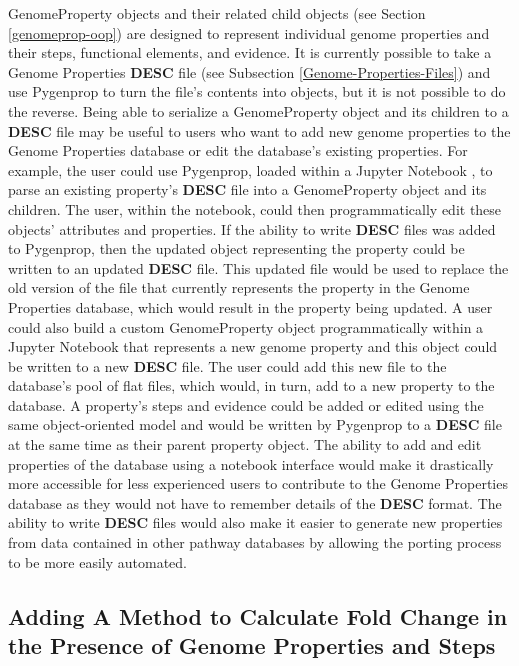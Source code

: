 GenomeProperty objects and their related child objects (see Section 
\ref{genomeprop-oop}) are designed to represent individual genome properties and 
their steps, functional elements, and evidence. It is currently possible to take 
a Genome Properties \textbf{DESC} file (see Subsection 
\ref{Genome-Properties-Files}) and use Pygenprop to turn the file's contents 
into objects, but it is not possible to do the reverse. Being able to serialize 
a GenomeProperty object and its children to a \textbf{DESC} file may be useful 
to users who want to add new genome properties to the Genome Properties database 
or edit the database's existing properties. For example, the user could use 
Pygenprop, loaded within a Jupyter Notebook \cite{kluyver2016jupyter}, to parse 
an existing property's \textbf{DESC} file into a GenomeProperty object and its 
children. The user, within the notebook, could then programmatically edit these 
objects' attributes and properties. If the ability to write \textbf{DESC} files 
was added to Pygenprop, then the updated object representing the property could 
be written to an updated \textbf{DESC} file. This updated file would be used to 
replace the old version of the file that currently represents the property in 
the Genome Properties database, which would result in the property being 
updated. A user could also build a custom GenomeProperty object programmatically 
within a Jupyter Notebook that represents a new genome property and this object 
could be written to a new \textbf{DESC} file. The user could add this new file 
to the database's pool of flat files, which would, in turn, add to a new 
property to the database. A property's steps and evidence could be added or 
edited using the same object-oriented model and would be written by Pygenprop to 
a \textbf{DESC} file at the same time as their parent property object. The 
ability to add and edit properties of the database using a notebook interface 
would make it drastically more accessible for less experienced users to 
contribute to the Genome Properties database as they would not have to remember 
details of the \textbf{DESC} format. The ability to write \textbf{DESC} files 
would also make it easier to generate new properties from data contained in 
other pathway databases by allowing the porting process to be more easily 
automated.

\subsection{Adding A Method to Calculate Fold Change in the Presence of Genome 
Properties and Steps}


